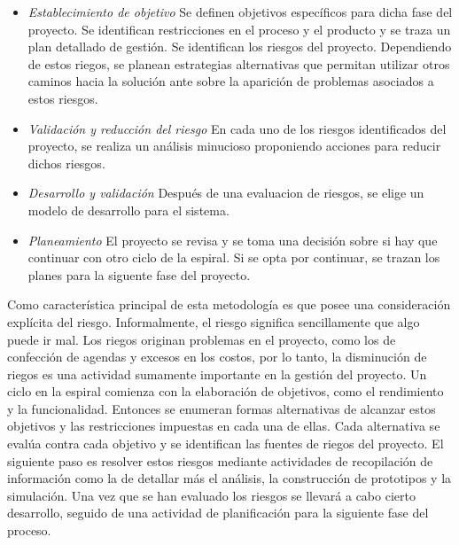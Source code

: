 \begin {itemize}
\item 
\textit{Establecimiento de objetivo}  Se definen objetivos específicos para dicha fase del proyecto. Se identifican restricciones en el proceso y el
producto y se traza un plan detallado de gestión. Se identifican los riesgos del proyecto. Dependiendo de estos riegos, se planean estrategias
alternativas que permitan utilizar otros caminos hacia la solución ante sobre la aparición de problemas asociados a estos riesgos.
\item 
\textit{Validación y reducción del riesgo}  En cada uno de los riesgos identificados del proyecto, se realiza un análisis minucioso proponiendo
acciones para reducir dichos riesgos.
\item 
\textit{Desarrollo y validación}  Después de una evaluacion de riesgos, se elige un modelo de desarrollo para el sistema.
\item 
\textit{Planeamiento}  El proyecto se revisa y se toma una decisión sobre si hay que continuar con otro ciclo de la espiral. Si se opta por continuar,
se trazan los planes para la siguente fase del proyecto.
\end {itemize}

Como característica principal de esta metodología es que posee una consideración explícita del riesgo. Informalmente, el riesgo significa
sencillamente que algo puede ir mal. Los riegos originan problemas en el proyecto, como los de confección de agendas y excesos en los costos, por lo
tanto, la disminución de riegos es una actividad sumamente importante en la gestión del proyecto. Un ciclo en la espiral comienza con la elaboración
de objetivos, como el rendimiento y la funcionalidad. Entonces se enumeran formas alternativas de alcanzar estos objetivos y las restricciones
impuestas en cada una de ellas. Cada alternativa se evalúa contra cada objetivo y se identifican las fuentes de riegos del proyecto. El siguiente
paso es resolver estos riesgos mediante actividades de recopilación de información como la de detallar más el análisis, la construcción de prototipos
y la simulación. Una vez que se han evaluado los riesgos se llevará a cabo cierto desarrollo, seguido de una actividad de planificación para la
siguiente fase del proceso.


